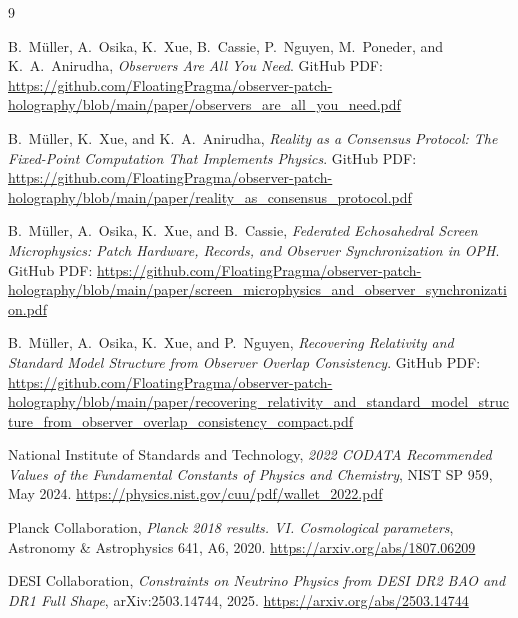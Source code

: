 \documentclass[11pt]{article}
\begin{document}
\begin{thebibliography}{9}

B.\ M\"uller, A.\ Osika, K.\ Xue, B.\ Cassie, P.\ Nguyen, M.\ Poneder, and K.\ A.\ Anirudha,
\emph{Observers Are All You Need}.
GitHub PDF:
\url{https://github.com/FloatingPragma/observer-patch-holography/blob/main/paper/observers_are_all_you_need.pdf}

B.\ M\"uller, K.\ Xue, and K.\ A.\ Anirudha,
\emph{Reality as a Consensus Protocol: The Fixed-Point Computation That Implements Physics}.
GitHub PDF:
\url{https://github.com/FloatingPragma/observer-patch-holography/blob/main/paper/reality_as_consensus_protocol.pdf}

B.\ M\"uller, A.\ Osika, K.\ Xue, and B.\ Cassie,
\emph{Federated Echosahedral Screen Microphysics: Patch Hardware, Records, and Observer Synchronization in OPH}.
GitHub PDF:
\url{https://github.com/FloatingPragma/observer-patch-holography/blob/main/paper/screen_microphysics_and_observer_synchronization.pdf}

B.\ M\"uller, A.\ Osika, K.\ Xue, and P.\ Nguyen,
\emph{Recovering Relativity and Standard Model Structure from Observer Overlap Consistency}.
GitHub PDF:
\url{https://github.com/FloatingPragma/observer-patch-holography/blob/main/paper/recovering_relativity_and_standard_model_structure_from_observer_overlap_consistency_compact.pdf}

National Institute of Standards and Technology,
\emph{2022 CODATA Recommended Values of the Fundamental Constants of Physics and Chemistry},
NIST SP 959, May 2024.
\url{https://physics.nist.gov/cuu/pdf/wallet_2022.pdf}

Planck Collaboration,
\emph{Planck 2018 results. VI. Cosmological parameters},
Astronomy \& Astrophysics 641, A6, 2020.
\url{https://arxiv.org/abs/1807.06209}

DESI Collaboration,
\emph{Constraints on Neutrino Physics from DESI DR2 BAO and DR1 Full Shape},
arXiv:2503.14744, 2025.
\url{https://arxiv.org/abs/2503.14744}

\end{thebibliography}
\end{document}

